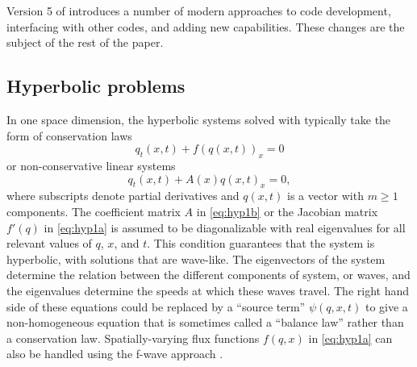 Version 5 of \clawpack introduces a number of modern approaches to
code development, interfacing with other codes, and adding new
capabilities. These changes are the subject of the rest of the paper.

\subsection{Hyperbolic problems}\label{sec:hyp}

In one space dimension, the hyperbolic systems solved with
\clawpack typically take the form of conservation laws
\begin{equation}\label{eq:hyp1a}
q_t(x,t) + f(q(x,t))_x = 0
\end{equation}
or non-conservative linear systems
\begin{equation}\label{eq:hyp1b}
q_t(x,t) + A(x) q(x,t)_x = 0,
\end{equation}
where subscripts denote partial derivatives and $q(x,t)$ is a vector with
$m\ge 1$ components.  The coefficient matrix $A$ in \cref{eq:hyp1b} or
the Jacobian matrix $f'(q)$ in \cref{eq:hyp1a} is assumed to be
diagonalizable with real eigenvalues for all relevant values of
$q$, $x$, and $t$.  This condition guarantees that the system is hyperbolic,
with solutions that are wave-like.  The eigenvectors of the system
determine the relation between the different components
of system, or waves, and the eigenvalues determine the speeds at which these
waves travel.  The right hand side of these equations could be
replaced by a ``source term'' $\psi(q,x,t)$ to give a non-homogeneous
equation that is sometimes called a ``balance law'' rather than a
conservation law.  Spatially-varying flux functions $f(q,x)$ in
\cref{eq:hyp1a} can also be handled using the f-wave approach
\cite{db-rjl-sm-jr:vcflux}.


